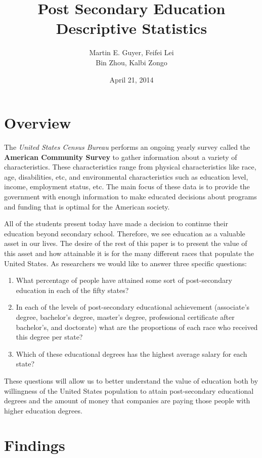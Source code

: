 \documentclass{article}
\title{Post Secondary Education Descriptive Statistics}
\author{Martin E. Guyer,  Feifei  Lei \\ Bin Zhou, Kalbi Zongo}
\date{April 21, 2014}
\begin{document}
\maketitle

\section{Overview}

The \emph{United States Census Bureau} performs an ongoing yearly survey called the \textbf{American Community
Survey} to gather information about a variety of characteristics. These characteristics range from physical characteristics
like race, age, disabilities, etc, and environmental characteristics such as education level, income, employment status, etc. 
The main focus of these data is to provide the government with enough information to make educated decisions about 
programs and funding that is optimal for the American society. 

All of the students present today have made a decision to continue their education beyond secondary school. Therefore,
we see education as a valuable asset in our lives. The desire of the rest of this paper is to present the value of this asset and
how attainable it is for the many different races that populate the United States. As researchers we would like to answer 
three specific questions:
	\begin{enumerate}
	\item What percentage of people have attained some sort of post-secondary education in each of the fifty states?
	
	\item In each of the levels of post-secondary educational achievement (associate's degree, bachelor's degree, 
	master's degree, professional certificate after bachelor's, and doctorate) what are the proportions of each race
	who received this degree per state? 
	
	\item Which of these educational degrees has the highest average salary for each state?
	\end{enumerate}
These questions will allow us to better understand the value of education both by willingness of the United States
population to attain post-secondary educational degrees and the amount of money that companies are paying
those people with higher education degrees. 

\section{Findings}
\end{document}
